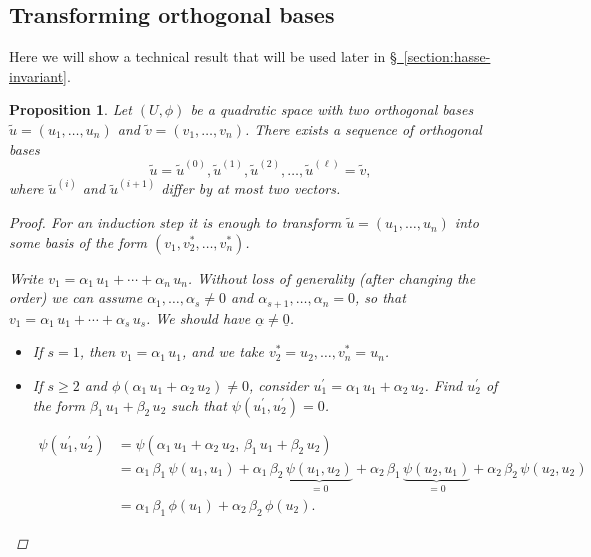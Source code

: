 \documentclass{article}
\newcommand{\refref}[2]{\hyperref[#2]{#1~\ref*{#2}}}
\theoremstyle{myplain}
\newtheorem{proposition}{Proposition}[section]
\theoremstyle{mydefinition}
\begin{document}
\subsection*{Transforming orthogonal bases}

Here we will show a technical result that will be used later in
\refref{\S}{section:hasse-invariant}.

\begin{proposition}\label{proposition:transforming-orthogonal-bases}
  Let $(U,\phi)$ be a quadratic space with two orthogonal bases
  $\widetilde{u} = (u_1,\ldots,u_n)$ and
  $\widetilde{v} = (v_1,\ldots,v_n)$. There exists a sequence of orthogonal
  bases
  \[ \widetilde{u} = \widetilde{u}^{(0)},
    \widetilde{u}^{(1)},
    \widetilde{u}^{(2)},
    \ldots,
    \widetilde{u}^{(\ell)} = \widetilde{v}, \]
  where $\widetilde{u}^{(i)}$ and $\widetilde{u}^{(i+1)}$ differ by at most two
  vectors.

\begin{proof}
  For an induction step it is enough to transform
  $\widetilde{u} = (u_1,\ldots,u_n)$ into some basis of the form
  $(v_1, v_2^*, \ldots, v_n^*)$.

  Write $v_1 = \alpha_1 \, u_1 + \cdots + \alpha_n \, u_n$. Without loss of
  generality (after changing the order) we can assume
  $\alpha_1, \ldots, \alpha_s \ne 0$ and $\alpha_{s+1}, \ldots, \alpha_n = 0$,
  so that $v_1 = \alpha_1 \, u_1 + \cdots + \alpha_s \, u_s$. We should have
  $\underline{\alpha} \ne \underline{0}$.

  \begin{itemize}
  \item If $s = 1$, then $v_1 = \alpha_1\,u_1$, and we take
    $v_2^* = u_2, \ldots, v_n^* = u_n$.

  \item If $s \ge 2$ and $\phi (\alpha_1 \, u_1 + \alpha_2 \, u_2) \ne 0$,
    consider $u_1^\prime = \alpha_1 \, u_1 + \alpha_2 \, u_2$. Find $u_2^\prime$
    of the form $\beta_1 \, u_1 + \beta_2 \, u_2$ such that
    $\psi (u_1^\prime, u_2^\prime) = 0$.

    \begin{align*}
      \psi (u_1^\prime, u_2^\prime) & = \psi (\alpha_1\,u_1 + \alpha_2\,u_2, \, \beta_1\,u_1 + \beta_2\,u_2) \\
                                    & = \alpha_1\,\beta_1\,\psi (u_1,u_1) +
                                      \alpha_1\,\beta_2\,\underbrace{\psi (u_1,u_2)}_{= 0} +
                                      \alpha_2\,\beta_1\,\underbrace{\psi (u_2,u_1)}_{= 0} +
                                      \alpha_2\,\beta_2\,\psi (u_2,u_2) \\
                                    & = \alpha_1 \, \beta_1 \, \phi (u_1) + \alpha_2 \, \beta_2 \, \phi (u_2).
    \end{align*}


\end{itemize}
\end{proof}
\end{proposition}
\end{document}
